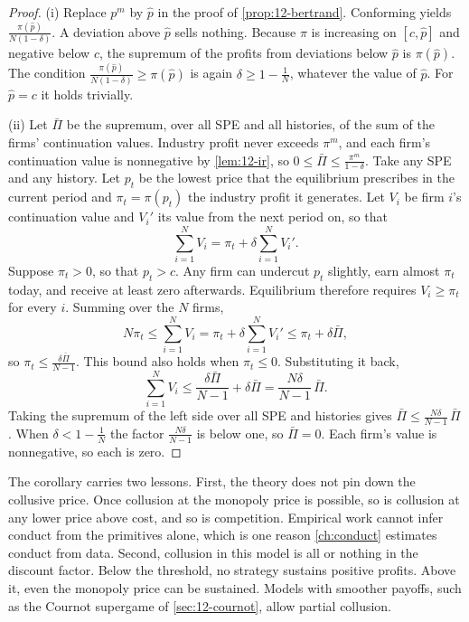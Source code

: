 \begin{proof}
(i) Replace $p^m$ by $\hat p$ in the proof of \cref{prop:12-bertrand}. Conforming yields
$\frac{\pi(\hat p)}{N(1 - \delta)}$. A deviation above $\hat p$ sells nothing. Because $\pi$ is increasing on
$[c, \hat p]$ and negative below $c$, the supremum of the profits from deviations below $\hat p$ is $\pi(\hat p)$. The
condition $\frac{\pi(\hat p)}{N(1 - \delta)} \ge \pi(\hat p)$ is again $\delta \ge 1 - \frac{1}{N}$, whatever the
value of $\hat p$. For $\hat p = c$ it holds trivially.

(ii) Let $\bar\Pi$ be the supremum, over all SPE and all histories, of the sum of the firms' continuation values.
Industry profit never exceeds $\pi^m$, and each firm's continuation value is nonnegative by \cref{lem:12-ir}, so
$0 \le \bar\Pi \le \frac{\pi^m}{1 - \delta}$. Take any SPE and any history. Let $p_t$ be the lowest price that the
equilibrium prescribes in the current period and $\pi_t = \pi(p_t)$ the industry profit it generates. Let $V_i$ be
firm $i$'s continuation value and $V_i'$ its value from the next period on, so that
\begin{equation*}
\sum_{i=1}^{N} V_i = \pi_t + \delta\sum_{i=1}^{N} V_i' .
\end{equation*}
Suppose $\pi_t > 0$, so that $p_t > c$. Any firm can undercut $p_t$ slightly, earn almost $\pi_t$ today, and receive
at least zero afterwards. Equilibrium therefore requires $V_i \ge \pi_t$ for every $i$. Summing over the $N$ firms,
\begin{equation*}
N\pi_t \le \sum_{i=1}^{N} V_i = \pi_t + \delta\sum_{i=1}^{N} V_i' \le \pi_t + \delta\bar\Pi ,
\end{equation*}
so $\pi_t \le \frac{\delta\bar\Pi}{N - 1}$. This bound also holds when $\pi_t \le 0$. Substituting it back,
\begin{equation*}
\sum_{i=1}^{N} V_i \le \frac{\delta\bar\Pi}{N - 1} + \delta\bar\Pi = \frac{N\delta}{N - 1}\,\bar\Pi .
\end{equation*}
Taking the supremum of the left side over all SPE and histories gives $\bar\Pi \le \frac{N\delta}{N - 1}\,\bar\Pi$. When
$\delta < 1 - \frac{1}{N}$ the factor $\frac{N\delta}{N - 1}$ is below one, so $\bar\Pi = 0$. Each firm's value is
nonnegative, so each is zero.
\end{proof}

The corollary carries two lessons. First, the theory does not pin down the collusive price. Once collusion at the
monopoly price is possible, so is collusion at any lower price above cost, and so is competition. Empirical work
cannot infer conduct from the primitives alone, which is one reason \cref{ch:conduct} estimates conduct from data.
Second, collusion in this model is all or nothing in the discount factor. Below the threshold, no strategy sustains
positive profits. Above it, even the monopoly price can be sustained. Models with smoother payoffs, such as the
Cournot supergame of \cref{sec:12-cournot}, allow partial collusion.

